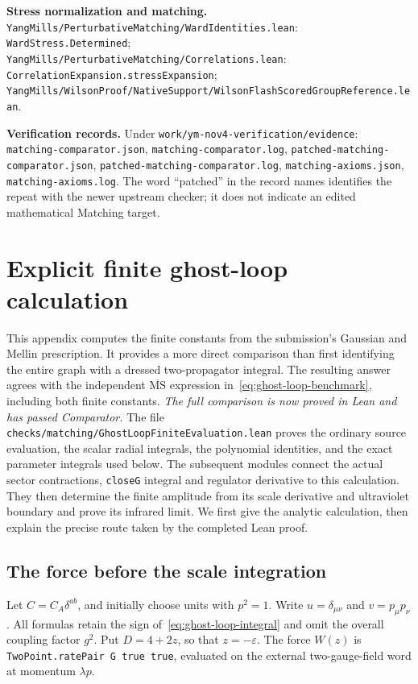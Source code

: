 \documentclass[11pt]{article}
\newcommand{\MS}{\overline{\mathrm{MS}}}
\newcommand{\code}[1]{{\small\nolinkurl{#1}}}
\newcommand{\src}[1]{\textsf{[#1]}}
\begin{document}
\begin{description}[leftmargin=3em,labelwidth=2.6em,align=left]
\item[\src{W}] \textbf{Stress normalization and matching.}
\code{YangMills/PerturbativeMatching/WardIdentities.lean}:
\code{WardStress.Determined};
\code{YangMills/PerturbativeMatching/Correlations.lean}:
\code{CorrelationExpansion.stressExpansion};
\code{YangMills/WilsonProof/NativeSupport/WilsonFlashScoredGroupReference.lean}.

\item[\src{Z}] \textbf{Verification records.}
Under \code{work/ym-nov4-verification/evidence}:
\code{matching-comparator.json}, \code{matching-comparator.log},
\code{patched-matching-comparator.json}, \code{patched-matching-comparator.log},
\code{matching-axioms.json}, \code{matching-axioms.log}.
The word ``patched'' in the record names identifies the repeat with the
newer upstream checker; it does not indicate an edited mathematical
Matching target.
\end{description}

\clearpage
\section{Explicit finite ghost-loop calculation}
\label{app:finite-ghost}

This appendix computes the finite constants from the submission's
Gaussian and Mellin prescription. It provides a more direct comparison
than first identifying the entire graph with a dressed two-propagator
integral. The resulting answer agrees with the independent
$\MS$ expression in~\eqref{eq:ghost-loop-benchmark}, including both
finite constants. \emph{The full comparison is now proved in Lean and
has passed Comparator.} The file
\code{checks/matching/GhostLoopFiniteEvaluation.lean}
proves the ordinary source evaluation, the scalar radial integrals,
the polynomial identities, and the exact parameter integrals used
below. The subsequent modules connect the actual sector contractions,
\code{closeG} integral and regulator derivative to this calculation.
They then determine the finite amplitude from its scale derivative
and ultraviolet boundary and prove its infrared limit. We first give
the analytic calculation, then explain the precise route taken by
the completed Lean proof.

\subsection{The force before the scale integration}

Let $C=C_A\delta^{ab}$, and initially choose units with $p^2=1$.
Write $u=\delta_{\mu\nu}$ and $v=p_\mu p_\nu$. All formulas retain
the sign of~\eqref{eq:ghost-loop-integral} and omit the overall
coupling factor $g^2$. Put $D=4+2z$, so that $z=-\varepsilon$.
The force $W(z)$ is \code{TwoPoint.ratePair G true true}, evaluated
on the external two-gauge-field word at momentum $\lambda p$.
\end{document}
